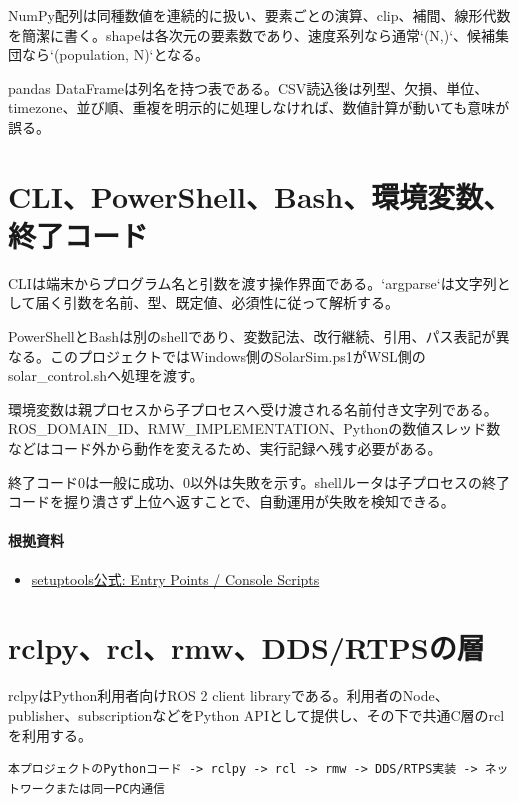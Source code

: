\documentclass[a4paper,11pt]{article}
\begin{document}
NumPy配列は同種数値を連続的に扱い、要素ごとの演算、clip、補間、線形代数を簡潔に書く。shapeは各次元の要素数であり、速度系列なら通常`(N,)`、候補集団なら`(population, N)`となる。


pandas DataFrameは列名を持つ表である。CSV読込後は列型、欠損、単位、timezone、並び順、重複を明示的に処理しなければ、数値計算が動いても意味が誤る。



\section{CLI、PowerShell、Bash、環境変数、終了コード}
CLIは端末からプログラム名と引数を渡す操作界面である。`argparse`は文字列として届く引数を名前、型、既定値、必須性に従って解析する。


PowerShellとBashは別のshellであり、変数記法、改行継続、引用、パス表記が異なる。このプロジェクトではWindows側のSolarSim.ps1がWSL側のsolar\_control.shへ処理を渡す。


環境変数は親プロセスから子プロセスへ受け渡される名前付き文字列である。ROS\_DOMAIN\_ID、RMW\_IMPLEMENTATION、Pythonの数値スレッド数などはコード外から動作を変えるため、実行記録へ残す必要がある。


終了コード0は一般に成功、0以外は失敗を示す。shellルータは子プロセスの終了コードを握り潰さず上位へ返すことで、自動運用が失敗を検知できる。

\paragraph{根拠資料}
\begin{itemize}[leftmargin=1.6em]
\item \href{https://setuptools.pypa.io/en/latest/userguide/entry_point.html}{setuptools公式: Entry Points / Console Scripts}
\end{itemize}

\section{rclpy、rcl、rmw、DDS/RTPSの層}
rclpyはPython利用者向けROS 2 client libraryである。利用者のNode、publisher、subscriptionなどをPython APIとして提供し、その下で共通C層のrclを利用する。


\begin{lstlisting}
本プロジェクトのPythonコード -> rclpy -> rcl -> rmw -> DDS/RTPS実装 -> ネットワークまたは同一PC内通信
\end{lstlisting}
\end{document}
